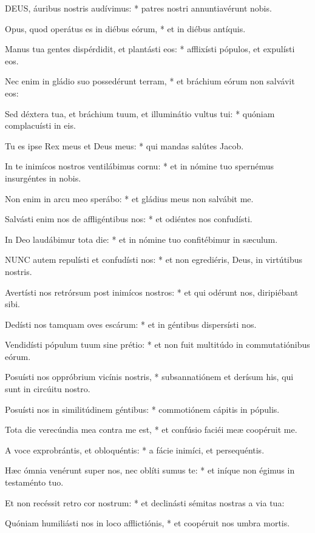 \lettrine[lines=2]{D}{EUS}, áuribus nostris audívimus: * patres nostri annuntiavérunt nobis.

Opus, quod operátus es in diébus eórum, * et in diébus antíquis.

Manus tua gentes dispérdidit, et plantásti eos: * afflixísti pópulos, et expulísti eos.

Nec enim in gládio suo possedérunt terram, * et bráchium eórum non salvávit eos:

Sed déxtera tua, et bráchium tuum, et illuminátio vultus tui: * quóniam complacuísti in eis.

Tu es ipse Rex meus et Deus meus: * qui mandas salútes Jacob.

In te inimícos nostros ventilábimus cornu: * et in nómine tuo spernémus insurgéntes in nobis.

Non enim in arcu meo sperábo: * et gládius meus non salvábit me.

Salvásti enim nos de affligéntibus nos: * et odiéntes nos confudísti.

In Deo laudábimur tota die: * et in nómine tuo confitébimur in sæculum.


\lettrine[lines=2]{N}{UNC} autem repulísti et confudísti nos: * et non egrediéris, Deus, in virtútibus nostris.

Avertísti nos retrórsum post inimícos nostros: * et qui odérunt nos, diripiébant sibi.

Dedísti nos tamquam oves escárum: * et in géntibus dispersísti nos.

Vendidísti pópulum tuum sine prétio: * et non fuit multitúdo in commutatiónibus eórum.

Posuísti nos oppróbrium vicínis nostris, * subsannatiónem et derísum his, qui sunt in circúitu nostro.

Posuísti nos in similitúdinem géntibus: * commotiónem cápitis in pópulis.

Tota die verecúndia mea contra me est, * et confúsio faciéi meæ coopéruit me.

A voce exprobrántis, et obloquéntis: * a fácie inimíci, et persequéntis.

Hæc ómnia venérunt super nos, nec oblíti sumus te: * et iníque non égimus in testaménto tuo.

Et non recéssit retro cor nostrum: * et declinásti sémitas nostras a via tua:

Quóniam humiliásti nos in loco afflictiónis, * et coopéruit nos umbra mortis.

